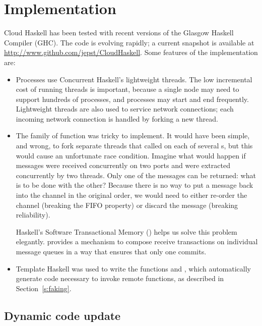 \documentclass{sigplanconf}
\begin{document}

\section{Implementation}
\label{s:Implementation}
Cloud Haskell has been tested with recent versions of the Glasgow Haskell Compiler (GHC). The code is evolving rapidly; a current snapshot is available at \url{http://www.github.com/jepst/CloudHaskell}. 
Some features of the implementation are:

\begin{itemize}
\item Processes use Concurrent Haskell's lightweight threads. The low incremental cost of running threads is important, because a single node may need to support hundreds of processes, and processes may start and end frequently. Lightweight threads are also used to service network connections; 
each incoming network connection is handled by forking a new thread.
\item The  family of function was tricky to implement. It would have been simple, and wrong, to fork separate threads that called  on each of several s, but this would cause an unfortunate race condition. 
Imagine what would happen if messages were received concurrently on two ports and were extracted concurrently by two threads. Only one of the messages can be returned: what is to be done with the other?  Because there is no way to put a message back into the channel in the original order, we would need to either re-order the channel (breaking the FIFO property) or discard the message (breaking reliability).

Haskell's Software Transactional Memory () helps us solve this problem elegantly.
 provides a mechanism to compose receive transactions on individual message queues in a way that ensures that only one commits.
\item Template Haskell was used to write the functions  and , which automatically generate code necessary to invoke remote functions, as described in Section~\ref{s:faking}.
\end{itemize}

\subsection{Dynamic code update} \label{s:code-update}
\end{document}
